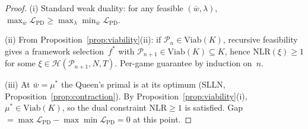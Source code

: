 \documentclass[11pt,a4paper]{article}
\newcommand{\cL}{\mathcal{L}}
\newcommand{\cP}{\mathcal{P}}
\newcommand{\cH}{\mathcal{H}}
\begin{document}
\begin{proof}
\textup{(i)}\;
Standard weak duality: for any feasible
$(\bar{w}, \lambda)$,
$\max_{\bar{w}} \cL_{\mathrm{PD}}
 \geq \max_\lambda \min_{\bar{w}} \cL_{\mathrm{PD}}$.

\medskip\noindent
\textup{(ii)}\;
From Proposition~\ref{prop:viability}\textup{(ii)}:
if $\cP_n \in \mathrm{Viab}(K)$, recursive feasibility
gives a framework selection~$f^*$ with
$\cP_{n+1} \in \mathrm{Viab}(K) \subseteq K$,
hence $\mathrm{NLR}(\xi) \geq 1$ for some
$\xi \in \cH(\cP_{n+1}, N, T)$.
Per-game guarantee by induction on~$n$.

\medskip\noindent
\textup{(iii)}\;
At $\bar{w} = \mu^*$ the Queen's primal is at its
optimum (SLLN, Proposition~\ref{prop:contraction}).
By Proposition~\ref{prop:viability}\textup{(i)},
$\mu^* \in \mathrm{Viab}(K)$, so the dual constraint
$\mathrm{NLR} \geq 1$ is satisfied.
Gap $= \max \cL_{\mathrm{PD}} - \max\min \cL_{\mathrm{PD}}
     = 0$ at this point.
\end{proof}
\end{document}
